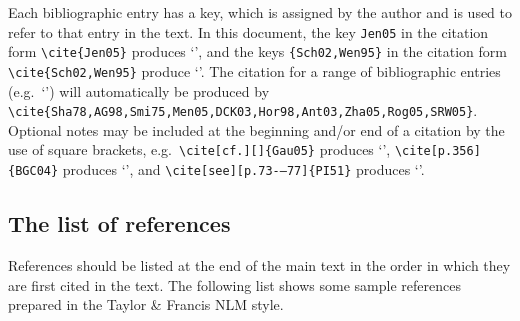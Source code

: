 \documentclass[]{interact}
\theoremstyle{plain}%
\theoremstyle{definition}
\theoremstyle{remark}
\begin{document}
Each bibliographic entry has a key, which is assigned by the author and is used to refer to that entry in the text. In this document, the key \verb"Jen05" in the citation form \verb"\cite{Jen05}" produces `\cite{Jen05}', and the keys \verb"{Sch02,Wen95}" in the citation form \verb"\cite{Sch02,Wen95}" produce `\cite{Sch02,Wen95}'. The citation for a range of bibliographic entries (e.g.\ `\cite{Sha78,AG98,Smi75,Men05,DCK03,Hor98,Ant03,Zha05,Rog05,SRW05}') will automatically be produced by  \verb"\cite{Sha78,AG98,Smi75,Men05,DCK03,Hor98,Ant03,Zha05,Rog05,SRW05}". Optional notes may be included at the beginning and/or end of a citation by the use of square brackets, e.g.\ \verb"\cite[cf.][]{Gau05}" produces `\cite[cf.][]{Gau05}', \verb"\cite[p.356]{BGC04}" produces `\cite[p.356]{BGC04}', and \verb"\cite[see][p.73-–77]{PI51}" produces `\cite[see][p.73--77]{PI51}'.


\subsection{The list of references}

References should be listed at the end of the main text in the order in which they are first cited in the text. The following list shows some sample references prepared in the Taylor \& Francis NLM style.
\end{document}

